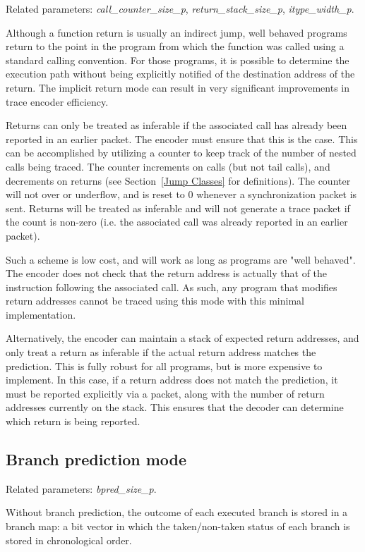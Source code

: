 Related parameters: \textit{call\_counter\_size\_p}, \textit{return\_stack\_size\_p}, \textit{itype\_width\_p}.

Although a function return is usually an indirect jump, well behaved programs return to the
point in the program from which the function was called using a standard calling convention.
For those programs, it is possible to determine the execution path without being explicitly notified
of the destination address of the return.  The implicit return mode can result in very
significant improvements in trace encoder efficiency.

Returns can only be treated as inferable if the associated call has already been reported in
an earlier packet.  The encoder must ensure that this is the case.  This can be accomplished
by utilizing a counter to keep track of the number of nested calls being traced.  The counter
increments on calls (but not tail calls), and decrements on returns (see Section~\ref{Jump Classes}
for definitions).  The counter will not over or underflow, and is reset to 0 whenever a
synchronization packet is sent.  Returns will be treated as inferable and will not generate a trace
packet if the count is non-zero (i.e. the associated call was already reported in an earlier packet).

Such a scheme is low cost, and will work as long as programs are "well behaved".  The encoder does not check that the
return address is actually that of the instruction following the associated call.  As such, any program that
modifies return addresses cannot be traced using this mode with this minimal implementation.

Alternatively, the encoder can maintain a stack of expected return addresses, and only treat a
return as inferable if the actual return address matches the prediction.  This is fully robust for all
programs, but is more expensive to implement.  In this case, if a return address does not match the prediction, 
it must be reported explicitly via a packet, along with the number of return addresses
currently on the stack.  This ensures that the decoder can determine which return is being reported. 

\subsection{Branch prediction mode} \label{sec:branch-prediction}

Related parameters: \textit{bpred\_size\_p}.

Without branch prediction, the outcome of each executed branch is stored in
a branch map: a bit vector in which the taken/non-taken status of each branch is stored in
chronological order.

